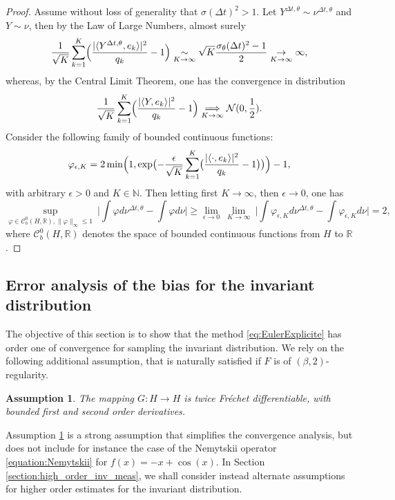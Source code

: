 \documentclass[11pt]{amsart}
\newcommand{\R}{\mathbb{R}}
\newcommand{\N}{\mathbb{N}}
\newtheorem{ass}{Assumption}
\begin{document}
\begin{proof}
Assume without loss of generality that $\sigma(\Delta t)^2>1$.
Let $Y^{\Delta t,\theta}\sim \nu^{\Delta t,\theta}$ and $Y\sim \nu$, then by the Law of Large Numbers, almost surely
\[
\frac{1}{\sqrt{K}}\sum_{k=1}^{K}\Bigl(\frac{|\langle Y^{\Delta t,\theta},e_k\rangle|^2}{q_k}-1\Bigr)\underset{K\to\infty}\sim \sqrt{K}\frac{\sigma_\theta(\Delta t)^2-1}{2}\underset{K\to\infty}\to \infty,
\]
whereas, by the Central Limit Theorem, one has the convergence in distribution
\[
\frac{1}{\sqrt{K}}\sum_{k=1}^{K}\Bigl(\frac{|\langle Y,e_k\rangle|^2}{q_k}-1\Bigr)\underset{K\to\infty}\implies \mathcal{N}(0,\frac12).
\]
Consider the following family of bounded continuous functions:
\[
\varphi_{\epsilon,K}=2\min\Bigl(1,\exp\bigl(-\frac{\epsilon}{\sqrt{K}}\sum_{k=1}^{K}\bigl(\frac{|\langle \cdot,e_k\rangle|^2}{q_k}-1\bigr)\bigr)\Bigr)-1,
\]
with arbitrary $\epsilon>0$ and $K\in\N$. Then letting first $K\to\infty$, then $\epsilon\to 0$, one has
\[
\underset{\varphi\in \mathcal{C}_b^0(H,\R),\|\varphi\|_\infty\le 1}\sup~\big|\int \varphi d\nu^{\Delta t,\theta}-\int\varphi d\nu\big|\ge \underset{\epsilon\to 0}\lim~\underset{K\to\infty}\lim~\big|\int \varphi_{\epsilon,K} d\nu^{\Delta t,\theta}-\int\varphi_{\epsilon,K} d\nu\big|=2,
\]
where $\mathcal{C}_b^0(H,\R)$ denotes the space of bounded continuous functions from $H$ to $\R$.
\end{proof}








\subsection{Error analysis of the bias for the invariant distribution}


The objective of this section is to show that the method \eqref{eq:EulerExplicite} has order one of convergence for sampling the invariant distribution.
%
We rely on the following additional assumption, that is naturally satisfied if $F$ is of $(\beta,2)$-regularity.
\begin{ass}\label{ass:F-Euler}
The mapping $G:H\to H$ is twice Fr\'echet differentiable, with bounded first and second order derivatives.
\end{ass}

Assumption \ref{ass:F-Euler} is a strong assumption that simplifies the convergence analysis, but does not include for instance the case of the Nemytskii operator \eqref{equation:Nemytskii} for $f(x)=-x+\cos(x)$. 
In Section \ref{section:high_order_inv_meas}, we shall consider instead alternate assumptions for higher order estimates for the invariant distribution.
\end{document}
